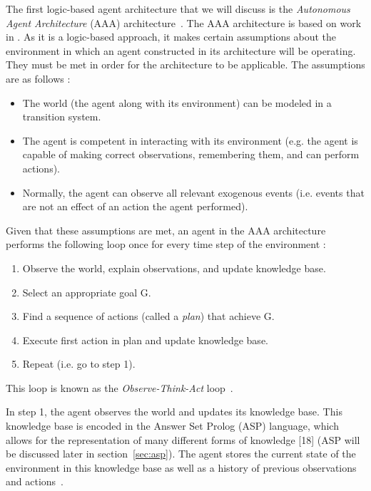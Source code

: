 The first logic-based agent architecture that we will discuss is the \textit{Autonomous Agent Architecture} (AAA) architecture~\cite{balduccini_aaa_2008}.
The AAA architecture is based on work in \cite{baral_reasoning_2000,balduccini_diagnostic_2003, balduccini_answer_2006,balduccini_learning_2007}.
As it is a logic-based approach, it makes certain assumptions about the environment in which an agent constructed in its architecture will be operating.
They must be met in order for the architecture to be applicable.
The assumptions are as follows \cite{balduccini_aaa_2008}:

\begin{itemize}
    \item The world (the agent along with its environment) can be modeled in a transition system.
    \item The agent is competent in interacting with its environment (e.g. the agent is capable of making correct observations, remembering them, and can perform actions).
    \item Normally, the agent can observe all relevant exogenous events (i.e. events that are not an effect of an action the agent performed).
\end{itemize}

Given that these assumptions are met, an agent in the AAA architecture performs the following loop once for every time step of the environment \cite{balduccini_aaa_2008}:

\begin{enumerate}
    \item Observe the world, explain observations, and update knowledge base.
    \item Select an appropriate goal G.
    \item Find a sequence of actions (called a \textit{plan}) that achieve G.
    \item Execute first action in plan and update knowledge base.
    \item Repeat (i.e. go to step 1).
\end{enumerate}

This loop is known as the \textit{Observe-Think-Act} loop~\cite{balduccini_aaa_2008}.

In step 1, the agent observes the world and updates its knowledge base.
This knowledge base is encoded in the Answer Set Prolog (ASP) language, which allows for the representation of many different forms of knowledge [18] (ASP will be discussed later in section~\ref{sec:asp}).
The agent stores the current state of the environment in this knowledge base as well as a history of previous observations and actions~\cite{balduccini_aaa_2008}.

